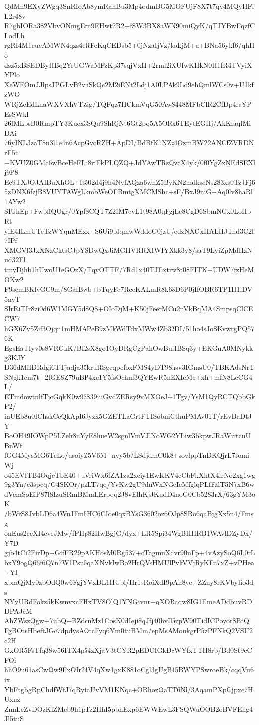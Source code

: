 QdMn9EXvZWgq3SnRIoAb8ymRahBu3Mp4odmBG5MOFUjF8X7t7qy4MQyHFiL2r48v
R7gbIORa382VbvONmgErn9EHwt2R2+fSW3BX8aWN90miQyK/qTJYBwFqzfCLodLh
rgRI4M1eucAMWN4qzs4eRFeKqCEDsb5+0jNzaIjVz/koLjM+a+BNa56ykf6/qhHo
dsz5xBSEDByHBq2YrUGWaMFzKp37sqjVxH+2rml2iXUfwKHkN0H1fR4TVyiXYPlo
XeWFOmJJlpsJPGLvB2vnSkQc2M2iENt2Ldj1A0LPAk9Ld9ehQmlWCs0v+U1kfzWO
WRjZcEdLnaWXVXhVTZig/TQFqz7HCkmVqG50AwS448MFbClR2CfDp4rsYPEsSWkl
26lMLpsB0RmpTY3Kuex3SQu9ShRjNt6Gt2pq5A5ORx6TEytEGHj/AkKfaqfMiDAi
76yINL3zaT8n3l1e4n6AcpGvcRZH+ApDI/BdBfK1NZz4OzmBW22ANCfZVRDNrF5t
+KVUZ0GMc6wBceHeFLt8riEkPLQZQ+JdYAwTRsQvcX4yk/0f0YgZxNEdSEXlj9P8
Ec9TXJOJAIBuXhOL+It502d4j9h4NvfAQza6whZ5ByKN2mdkseNs283xs0TzJFj6
5zDNX6fzjB8VUYTAWgLkmbWeOFBmtgXMCMShc+sF/BxJ9niG+Aq0lv8haRl1AYw2
SIUhEp+FwbffQUgr/0YpfSCQT7Z2IM7cvL1t98A0qFgjLc8CgD6SbmNCx0LoHpRt
yiE4ILmUTeTzWYqnMExx+S6Ui9pIqmwWddoG0jzU/edzNXGxHALHJTnd3C2l7IPf
XMGVl3JxXNzCktsCJpYSDwQxJiMGHVRRXIWIYXkk3y8/saT9LyiZpMdHzNud32Fl
tmyDjhb1hUwoU1eGOzX/TqyOTTF/7Rd1x40TJExtrw8t08FITK+UDW7fzHeMOKw2
F9semBKlvGC9m/8GafBwb+bTqyFc7RceKALmR8k68D6P0jIfOBR6TP1H1lDV5nvT
SIrRiTIr8zi0d6W1MGY5dSQ8+OIoDjM+K50jFeerMCu2nVkBqMA4SmpsqClCECW7
hGX6Zv5Zif3Ojqii1mHMAPeB9zMkWdTdxMWw4Zb32DI/51ho4sJoSKvwrgPQ576K
EgsEaTIyv0s8VRGkK/BI2sX8go1OyDRgCgPahOwBuHBSq3y+EKGuA0MNykkg3KJY
D36dMiIDRdgi6TTjadja35kruRSgcqpcfoxFMS4yDT98hsv3IGmsU0/TBKAdsNrT
SNgk1cni7t+2fGE8Z79uBP4xe1Y5fsOchnf3QYEwR5nEXIeMc+xh+mfN8LcCG4L/
ETmdowtnlfTjcGqkK0w93839iuGvdZERsy9vMXOeJ+1Tgv/YsM1QyRCTQbbGkP2/
inUEb8u0IChskCeQkApI6Jyzx5GZETLaGrtFTISobniGthuPMAv01T/rEvBaDtJY
BoOH49IOWpP5LZeh8nYyE8hueW2sgnlVmVJlNoWG2YLiw3bkpwJRaWirtcuUBnWf
fGG4MysMG6TcLo/usoiyZ5V6M+nyy5b/LSdjdmC0k8+sovlppTnDKQjrL7tomiWj
o45EVfTB4OqjeTbE40+uVriWx6fZA1za2xeiy1EwKKV4cCbFkXhtX4lrNo2xg1wg
9g3Yn/c3spcq/G4SKOr/pzLT7qq/YvKw2gU9dnWxNGeIeMfglqPLfFzlT5N7xB6w
dVemSoEiP87l8IzuSRmBMmLErpqq2J8vElhKjJKudD4noG0Cb5283rX/63gYM3oK
/bWrS8JvbLD6a4WuJFm5HC6CIoe0qxBYsG3602oz6OJp8SRo6qaBjgXx5n4/Fmsg
onEus2ccXI4cvrJMw/fPHp82HwBgjG/dyx+LR5Spi34WgBHHRB1WAvlDZyDx/Y7D
gjb4tCi2FirDp+GifFR29pAKHosM0Rg537+cTagmuXdvr90nFp+4vAzySoQ6L0rL
bxY9ogQ66f6Q7n7W1Psn5qaXNvkIwBo2HrQVsHMUlPvkVVjRyKFn7xZ+vPHea+YI
xbmQjMy0zbOdQ0w6FgjYVxDL1HUbl/Hr1sRoiXdI9pAh8yc+ZZny8rKVbyIio3ds
NYyURdFokz5kKwnvxcFHxTV8OlQ1YNGjvnr+qXORaqw8IG1EmeADdbuvRDDPAJcM
AhZWszQgw+7ubQ+BZdcnMz1CosK0dIeji8qJfj40hvIl5zpW90TidICPoyor8BtQ
FgBOtsHbeftJGc7dpdysAOtcFyq6Ym0tuBMm/epMsAMoukgrP5zPFNkQ2VSU2c2H
GxOR5FsTfq38w56ITX4p54zXjaV3tCYR2pEDCIGkDcWYfxTTH8rb/Bd0St9eCFOi
hhO9u61asCwQw9FxOIr24V4qXw1gxK881oCgl3gUgB45BWYPSwroeBk/cqqVu6ix
YbFtgbgRpChdfWfJ7qRytaUvVM1KNqc+ORhozQaTT6Nl/3AqamPXpCjpxc7HUxnz
ZnnLeZvDOzKiZMeb9h1pTz2HhI5pbhExp6EWWEwL3FSQWuOOB2oBVFEhg4Jl5tuS
